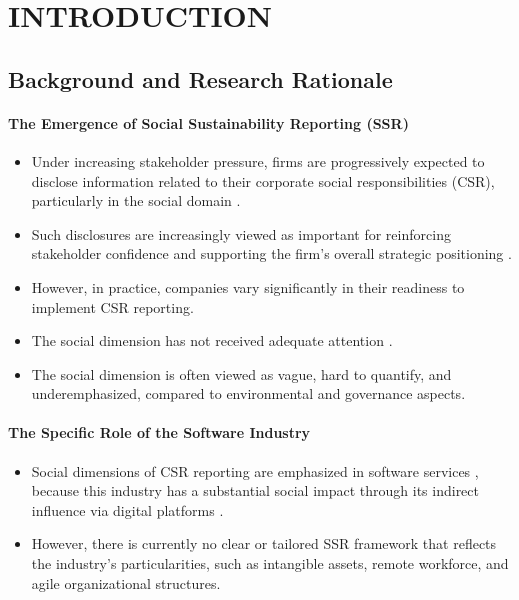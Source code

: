 \chapter{INTRODUCTION}

\section{Background and Research Rationale}

\subsubsection{The Emergence of Social Sustainability Reporting (SSR)}
\begin{itemize}
    \item Under increasing stakeholder pressure, firms are progressively expected to disclose information related to their corporate social responsibilities (CSR), particularly in the social domain \parencite{Monteiro2022}.
    \item Such disclosures are increasingly viewed as important for reinforcing stakeholder confidence and supporting the firm’s overall strategic positioning \parencite{Monteiro2022}.
    \item However, in practice, companies vary significantly in their readiness to implement CSR reporting.
    \item The social dimension has not received adequate attention \parencite{Heldal2024}.
    \item The social dimension is often viewed as vague, hard to quantify, and underemphasized, compared to environmental \parencite{Morais2018} and governance aspects.
\end{itemize}

\subsubsection{The Specific Role of the Software Industry}
\begin{itemize}
    \item Social dimensions of CSR reporting are emphasized in software services \parencite{HolderWebb2007}, because this industry has a substantial social impact through its indirect influence via digital platforms \parencite{Jimenez2023}.
    \item However, there is currently no clear or tailored SSR framework that reflects the industry’s particularities, such as intangible assets, remote workforce, and agile organizational structures.
\end{itemize}

